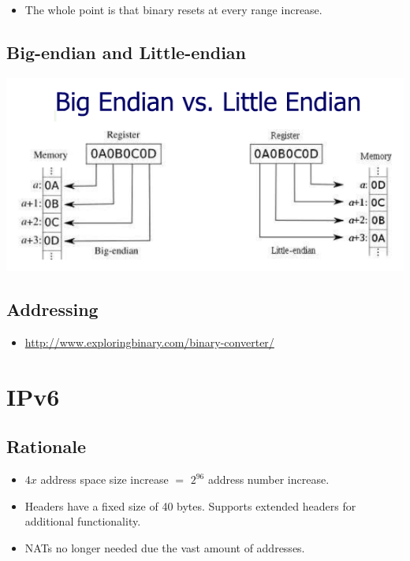 \documentclass{article}
\begin{document}
\begin{itemize}
	\item The whole point is that binary resets at every range increase.
\end{itemize}


\subsection{Big-endian and Little-endian}

\begin{center}
\includegraphics[scale=0.5]{images/BI-LI.png}\\[1cm]
\end{center}


\subsection{Addressing}

\begin{itemize}
	\item \url{http://www.exploringbinary.com/binary-converter/}
\end{itemize}


\newpage







\section{IPv6}


\subsection{Rationale}

\begin{itemize}
	\item $4x$ address space size increase $=$ $2^{96}$ address number increase.
	\item Headers have a fixed size of 40 bytes. Supports extended headers for additional functionality.
	\item NATs no longer needed due the vast amount of addresses.
\end{itemize}
\end{document}
